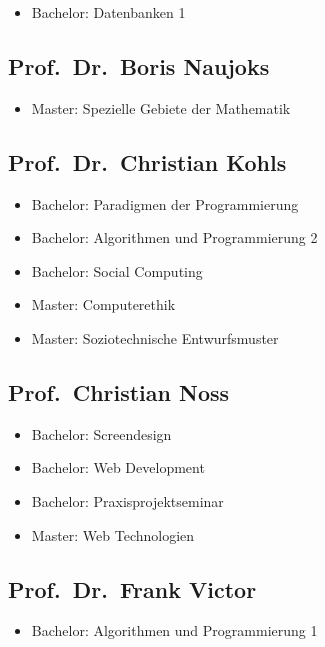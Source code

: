 \begin{itemize}
\tightlist
\item
  Bachelor: Datenbanken 1
\end{itemize}

\subsection{Prof.~Dr.~Boris Naujoks}\label{prof.dr.boris-naujoks}

\begin{itemize}
\tightlist
\item
  Master: Spezielle Gebiete der Mathematik
\end{itemize}

\subsection{Prof.~Dr.~Christian Kohls}\label{prof.dr.christian-kohls}

\begin{itemize}
\tightlist
\item
  Bachelor: Paradigmen der Programmierung
\item
  Bachelor: Algorithmen und Programmierung 2
\item
  Bachelor: Social Computing
\item
  Master: Computerethik
\item
  Master: Soziotechnische Entwurfsmuster
\end{itemize}

\subsection{Prof.~Christian Noss}\label{prof.christian-noss}

\begin{itemize}
\tightlist
\item
  Bachelor: Screendesign
\item
  Bachelor: Web Development
\item
  Bachelor: Praxisprojektseminar
\item
  Master: Web Technologien
\end{itemize}

\subsection{Prof.~Dr.~Frank Victor}\label{prof.dr.frank-victor}

\begin{itemize}
\tightlist
\item
  Bachelor: Algorithmen und Programmierung 1
\end{itemize}

